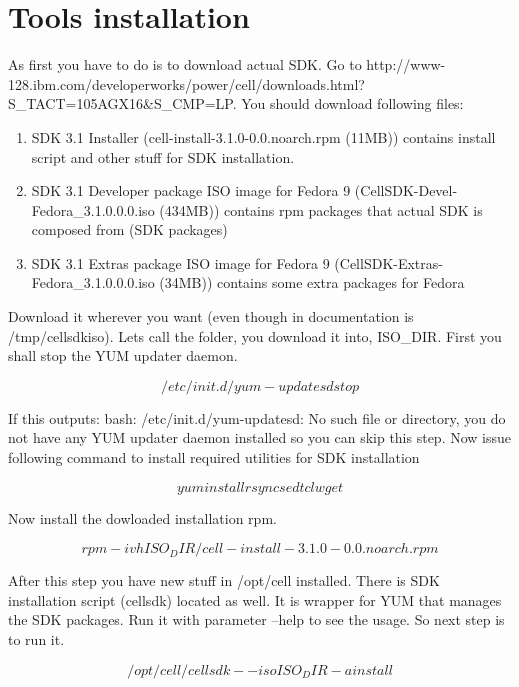 \documentclass{article}
\begin{document}
\section{Tools installation}
As first you have to do is to download actual SDK. Go to http://www-128.ibm.com/developerworks/power/cell/downloads.html?S_TACT=105AGX16&S_CMP=LP. You should download following files:

\begin{enumerate} 
\item SDK 3.1 Installer (cell-install-3.1.0-0.0.noarch.rpm  (11MB))
contains install script and other stuff for SDK installation.
\item SDK 3.1 Developer package ISO image for Fedora 9 (CellSDK-Devel-Fedora_3.1.0.0.0.iso  (434MB))
contains rpm packages that actual SDK is composed from (SDK packages) 
\item SDK 3.1 Extras package ISO image for Fedora 9 (CellSDK-Extras-Fedora_3.1.0.0.0.iso  (34MB))
contains some extra packages for Fedora
\end{enumerate}

Download it wherever you want (even though in documentation is /tmp/cellsdkiso). Lets call the folder, you download it into, ISO_DIR.  First you shall stop the YUM updater daemon.

\begin{equation}
/etc/init.d/yum-updatesd stop
\end{equation}

If this outputs: bash: /etc/init.d/yum-updatesd: No such file or directory, you do not have any YUM updater daemon installed so you can skip this step. Now issue following command to install required utilities for SDK installation

\begin{equation}
yum install rsync sed tcl wget
\end{equation}

Now install the dowloaded installation rpm.

\begin{equation}
rpm -ivh ISO_DIR/cell-install-3.1.0-0.0.noarch.rpm
\end{equation}

After this step you have new stuff in /opt/cell installed. There is SDK installation script (cellsdk) located as well. It is wrapper for YUM that manages the SDK packages. Run it with parameter --help to see the usage. So next step is to run it. 

\begin{equation}
/opt/cell/cellsdk --iso ISO_DIR -a install
\end{equation}
\end{document}
